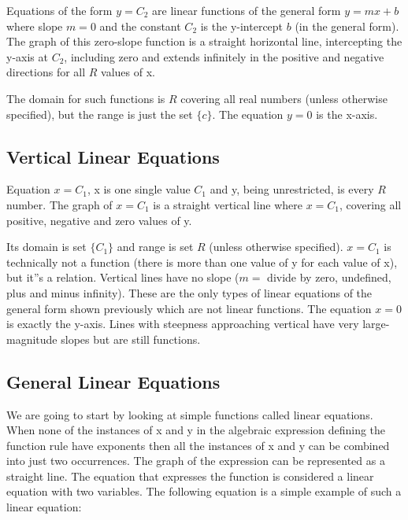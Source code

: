 Equations of the form $y = C_2$ are linear functions of the general form $y = mx + b$ where slope $m = 0$ and the constant $C_2$ is the y-intercept $b$ (in the general form). The graph of this zero-slope function is a straight horizontal line, intercepting the y-axis at $C_2$, including zero and extends infinitely in the positive and negative directions for all $R$ values of x.


The domain for such functions is $R$ covering all real numbers (unless otherwise specified), but the range is just the set $\{ c \}$. The equation $y = 0$ is the x-axis.

\subsection{Vertical Linear Equations}
\label{sss:vert-19e2}

Equation $x = C_1$, x is one single value $C_1$ and y, being unrestricted, is every $R$ number. The graph of $x = C_1$ is a straight vertical line where $x = C_1$, covering all positive, negative and zero values of y.


Its domain is set $\{ C_1 \}$ and range is set $R$ (unless otherwise specified). $x = C_1$ is technically not a function (there is more than one value of y for each value of x), but it''s a relation. Vertical lines have no slope ($m =$ divide by zero, undefined, plus and minus infinity). These are the only types of linear equations of the general form shown previously which are not linear functions. The equation $x = 0$ is exactly the y-axis. Lines with steepness approaching vertical have very large-magnitude slopes but are still functions.

\subsection{General Linear Equations}
\label{sss:gene-4191}

We are going to start by looking at simple functions called linear equations. When none of
the instances of x and y in the algebraic expression defining the function rule have
exponents then all the instances of x and y can be combined into just two occurrences. The
graph of the expression can be represented as a straight line. The equation that expresses
the function is considered a linear equation with two variables. The following equation is
a simple example of such a linear equation:

